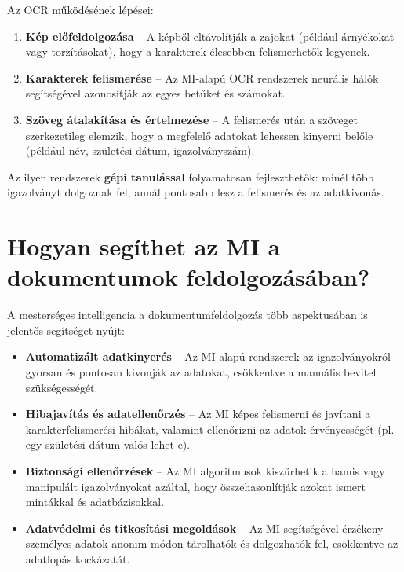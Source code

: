 \documentclass[
]{thesis-ekf}
\theoremstyle{definition}
\theoremstyle{remark}
\begin{document}
	Az OCR működésének lépései:
	\begin{enumerate}
		\item \textbf{Kép előfeldolgozása} -- A képből eltávolítják a zajokat (például árnyékokat vagy torzításokat), hogy a karakterek élesebben felismerhetők legyenek.
		\item \textbf{Karakterek felismerése} -- Az MI-alapú OCR rendszerek neurális hálók segítségével azonosítják az egyes betűket és számokat.
		\item \textbf{Szöveg átalakítása és értelmezése} -- A felismerés után a szöveget szerkezetileg elemzik, hogy a megfelelő adatokat lehessen kinyerni belőle (például név, születési dátum, igazolványszám).
	\end{enumerate}
	
	Az ilyen rendszerek \textbf{gépi tanulással} folyamatosan fejleszthetők: minél több igazolványt dolgoznak fel, annál pontosabb lesz a felismerés és az adatkivonás.
	
	\section{Hogyan segíthet az MI a dokumentumok feldolgozásában?}
	A mesterséges intelligencia a dokumentumfeldolgozás több aspektusában is jelentős segítséget nyújt:
	\begin{itemize}
		\item \textbf{Automatizált adatkinyerés} -- Az MI-alapú rendszerek az igazolványokról gyorsan és pontosan kivonják az adatokat, csökkentve a manuális bevitel szükségességét.
		\item \textbf{Hibajavítás és adatellenőrzés} -- Az MI képes felismerni és javítani a karakterfelismerési hibákat, valamint ellenőrizni az adatok érvényességét (pl. egy születési dátum valós lehet-e).
		\item \textbf{Biztonsági ellenőrzések} -- Az MI algoritmusok kiszűrhetik a hamis vagy manipulált igazolványokat azáltal, hogy összehasonlítják azokat ismert mintákkal és adatbázisokkal.
		\item \textbf{Adatvédelmi és titkosítási megoldások} -- Az MI segítségével érzékeny személyes adatok anonim módon tárolhatók és dolgozhatók fel, csökkentve az adatlopás kockázatát.
	\end{itemize}
\end{document}
